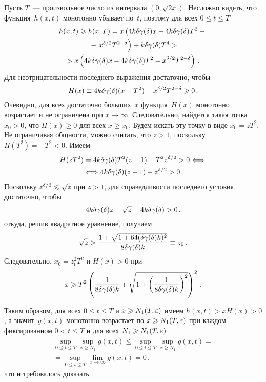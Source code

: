 \begin{multicols}{2}
Пусть $T$~--- произвольное число из интервала $(0, \sqrt{2x})$.
Несложно видеть, что функция~$h(x, t)$ монотонно убывает по~$t$,
поэтому для всех $0 \le t \le T$
\begin{multline*}
h(x, t) \geqslant h(x, T) = x \left( 4k\delta\gamma(\delta) x - 4k\delta\gamma(\delta) T^2 -{}\right.\\
{}-\left.
x^{\delta/2}T^{2-\delta}\right) + k\delta\gamma(\delta) T^4 > \\
> x \left( 4k\delta\gamma(\delta) x - 4k\delta\gamma(\delta) T^2 - x^{\delta/2}T^{2-\delta}\right)\,.
\end{multline*}
Для неотрицательности последнего выражения достаточно, чтобы
$$
H(x)\equiv 4k\delta\gamma(\delta) (x - T^2) - x^{\delta/2}T^{2-\delta}\geqslant0\,.
$$
Очевидно, для всех достаточно больших~$x$ функция~$H(x)$ монотонно
возрастает и не ограничена при $x\to\infty$. Следовательно, найдется
такая точка $x_0>0$, что $H(x)\ge0$ для всех $x\ge x_0$. Будем
искать эту точку в виде $x_0=zT^2$. Не ограничивая общности, можно
считать, что $z>1$, поскольку $H(T^2)=-T^2<0$. Имеем
\begin{multline*}
H(zT^2) = 4k\delta\gamma(\delta) T^2(z-1) - T^2z^{\delta/2} > 0 
\Longleftrightarrow{}\\
{}\Longleftrightarrow{} 4k\delta\gamma(\delta)(z-1) - z^{\delta/2} > 0\,.
\end{multline*}
Поскольку $z^{\delta/2} \leqslant \sqrt{z}$ при $z>1$, для справедли\-вости
последнего условия достаточно, чтобы
$$
4k\delta\gamma(\delta) z - \sqrt{z} - 4k\delta\gamma(\delta) > 0\,,
$$
откуда, решив квадратное уравнение, получаем
$$
\sqrt{z} >\displaystyle\frac{\displaystyle 1 + \sqrt{1 + 64(\delta\gamma(\delta) k)^2}\mathstrut}{\displaystyle 8\delta\gamma(\delta) k\mathstrut}\equiv z_0\,.
$$
Следовательно, $x_0=z_0^2T^2$ и $H(x) > 0$ при
$$
x\geqslant  T^2 \left( \displaystyle\frac{\displaystyle 1\mathstrut}{\displaystyle 8\delta\gamma(\delta) k\mathstrut} + \sqrt{1 + \left( \displaystyle\frac{\displaystyle 1\mathstrut}{\displaystyle 8\delta\gamma(\delta)
k\mathstrut}\right)^2} \right)^2\,.
$$

Таким образом, для всех $0 \le t \le T$ и $x \geqslant N_1(T,\varepsilon)$ имеем
$h(x, t)>xH(x)>0$, а значит~$\widetilde{g}(x, t)$ монотонно
возрастает по $x \geqslant N_1(T,\varepsilon)$ при каждом фиксированном $0<t\le
T$ и для всех $N_1 \geqslant N_1(T,\varepsilon)$
\begin{multline*}
\sup\limits_{0 \le t \le T} \sup_{x \ge N_1} g(x, t) \le \sup\limits_{0 \le t \le
T} \sup\limits_{x \ge N_1} \widetilde{g}(x, t) ={}\\
{}= \sup\limits_{0 \le t \le T}
\lim_{x\rightarrow\infty} \widetilde{g}(x, t) = 0\,,
\end{multline*}
что и требовалось доказать.


\end{multicols}
